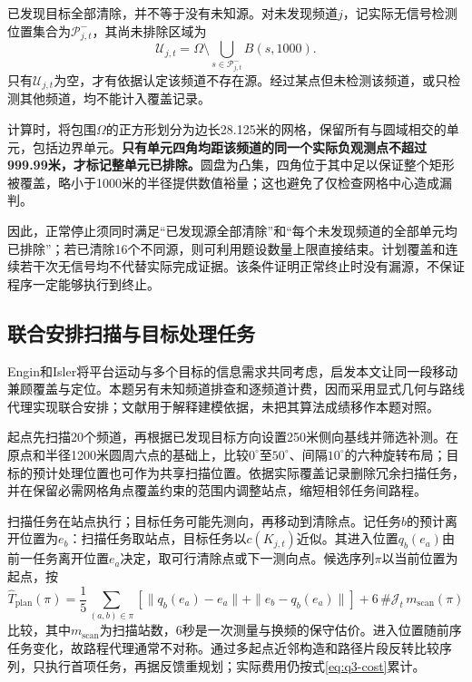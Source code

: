 已发现目标全部清除，并不等于没有未知源。对未发现频道$j$，记实际无信号检测位置集合为$\mathcal P^-_{j,t}$，其尚未排除区域为
\begin{equation}
\mathcal U_{j,t}=\Omega\setminus
 \bigcup_{s\in\mathcal P^-_{j,t}}B(s,1000).
\label{eq:q3-uncovered}
\end{equation}
只有$\mathcal U_{j,t}$为空，才有依据认定该频道不存在源。经过某点但未检测该频道，或只检测其他频道，均不能计入覆盖记录。

计算时，将包围$\Omega$的正方形划分为边长28.125米的网格，保留所有与圆域相交的单元，包括边界单元。\textbf{只有单元四角均距该频道的同一个实际负观测点不超过999.99米，才标记整单元已排除。}圆盘为凸集，四角位于其中足以保证整个矩形被覆盖，略小于1000米的半径提供数值裕量；这也避免了仅检查网格中心造成漏判。

因此，正常停止须同时满足“已发现源全部清除”和“每个未发现频道的全部单元均已排除”；若已清除16个不同源，则可利用题设数量上限直接结束。计划覆盖和连续若干次无信号均不代替实际完成证据。该条件证明正常终止时没有漏源，不保证程序一定能够执行到终止。

\subsection{联合安排扫描与目标处理任务}

Engin和Isler将平台运动与多个目标的信息需求共同考虑\cite{Engin2020}，启发本文让同一段移动兼顾覆盖与定位。本题另有未知频道排查和逐频道计费，因而采用显式几何与路线代理实现联合安排；文献用于解释建模依据，未把其算法成绩移作本题对照。

起点先扫描20个频道，再根据已发现目标方向设置250米侧向基线并筛选补测。在原点和半径1200米圆周六点的基础上，比较$0^\circ$至$50^\circ$、间隔$10^\circ$的六种旋转布局；目标的预计处理位置也可作为共享扫描位置。依据实际覆盖记录删除冗余扫描任务，并在保留必需网格角点覆盖约束的范围内调整站点，缩短相邻任务间路程。

扫描任务在站点执行；目标任务可能先测向，再移动到清除点。记任务$b$的预计离开位置为$e_b$：扫描任务取站点，目标任务以$c(K_{j,t})$近似。其进入位置$q_b(e_a)$由前一任务离开位置$e_a$决定，取可行清除点或下一测向点。候选序列$\pi$以当前位置为起点，按
\begin{equation}
\widehat T_{\mathrm{plan}}(\pi)=
\frac15\sum_{(a,b)\in\pi}
\left[\|q_b(e_a)-e_a\|+\|e_b-q_b(e_a)\|\right]
+6\,\#\mathcal J_t\,m_{\mathrm{scan}}(\pi)
\label{eq:q3-route-score}
\end{equation}
比较，其中$m_{\mathrm{scan}}$为扫描站数，6秒是一次测量与换频的保守估价。进入位置随前序任务变化，故路程代理通常不对称。通过多起点近邻构造和路径片段反转比较序列，只执行首项任务，再据反馈重规划；实际费用仍按式\eqref{eq:q3-cost}累计。


